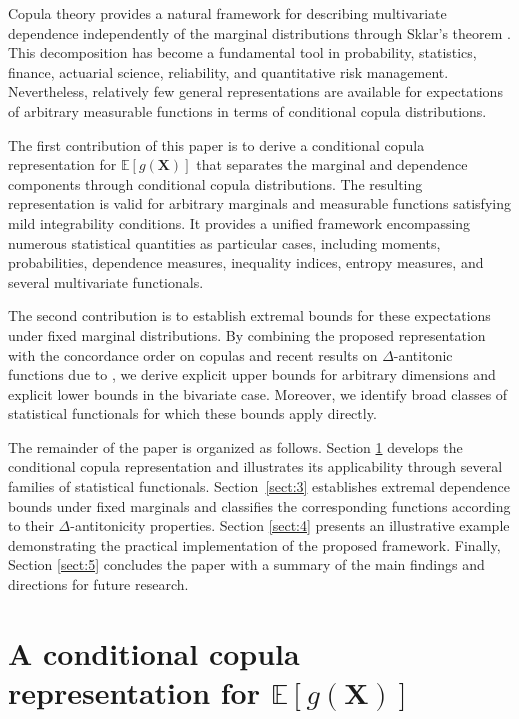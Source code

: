 \documentclass[12pt]{article}
\begin{document}
Copula theory provides a natural framework for describing multivariate dependence independently of the marginal distributions through Sklar's theorem \cite{Sklar-1959}. This decomposition has become a fundamental tool in probability, statistics, finance, actuarial science, reliability, and quantitative risk management. Nevertheless, relatively few general representations are available for expectations of arbitrary measurable functions in terms of conditional copula distributions.

The first contribution of this paper is to derive a conditional copula representation for
$\mathbb E[g(\boldsymbol X)]$
that separates the marginal and dependence components through conditional copula distributions. The resulting representation is valid for arbitrary 
marginals and measurable functions satisfying mild integrability conditions. It provides a unified framework encompassing numerous statistical quantities as particular cases, including moments, probabilities, dependence measures, inequality indices, entropy measures, and several multivariate functionals.

The second contribution is to establish extremal bounds for these expectations under fixed marginal distributions. By combining the proposed representation with the concordance order on copulas and recent results on $\Delta$-antitonic functions due to \cite{Lux2017}, we derive explicit upper bounds for arbitrary dimensions and explicit lower bounds in the bivariate case. Moreover, we identify broad classes of statistical functionals for which these bounds apply directly.

The remainder of the paper is organized as follows. Section \ref{sect:2} develops the conditional copula representation and illustrates its applicability through several families of statistical functionals. Section~\ref{sect:3} establishes extremal dependence bounds under fixed marginals and classifies the corresponding functions according to their $\Delta$-antitonicity properties. Section \ref{sect:4} presents an illustrative example demonstrating the practical implementation of the proposed framework. Finally, Section \ref{sect:5} concludes the paper with a summary of the main findings and directions for future research.




\section{A conditional copula representation for $\mathbb E[g(\pmb{X})]$} \label{sect:2}
\end{document}
